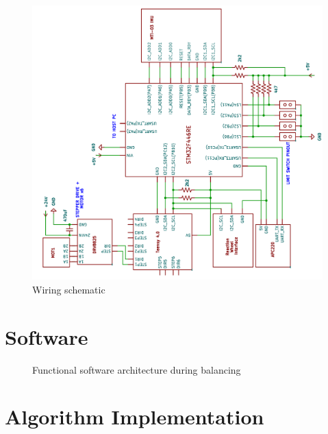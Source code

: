 \begin{figure}[h]
    \centering
    \includegraphics[width=0.95\linewidth,angle=-90]{figures/wiring.png}
    \caption{Wiring schematic}
    \label{fig:wiring}
\end{figure}




\section{Software}

\begin{figure}
    \centering
    
    \caption{Functional software architecture during balancing}
    \label{fig:software_flowchart}
\end{figure}




\section{Algorithm Implementation}



